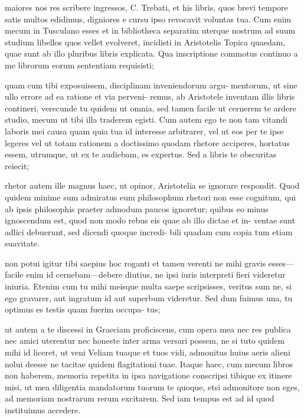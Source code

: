 
 maiores nos res scribere ingressos, C. Trebati, et his libris, quos brevi tempore satis multos edidimus, digniores e cursu ipso revocavit voluntas tua. Cum enim mecum in Tusculano esses et in bibliotheca separatim uterque nostrum ad suum studium libellos quos vellet evolveret, incidisti in Aristotelis Topica quaedam, quae sunt ab illo pluribus libris explicata. Qua inscriptione commotus continuo a me librorum eorum sententiam requisisti;

 quam cum tibi exposuissem, disciplinam inveniendorum argu- mentorum, ut sine ullo errore ad ea ratione et via perveni- remus, ab Aristotele inventam illis libris contineri, verecunde tu quidem ut omnia, sed tamen facile ut cernerem te ardere studio, mecum ut tibi illa traderem egisti. Cum autem ego te non tam vitandi laboris mei causa quam quia tua id interesse arbitrarer, vel ut eos per te ipse legeres vel ut totam rationem a doctissimo quodam rhetore acciperes, hortatus essem, utrumque, ut ex te audiebam, es expertus. Sed a libris te obscuritas reiecit;

 rhetor autem ille magnus haec, ut opinor, Aristotelia se ignorare respondit. Quod quidem minime sum admiratus eum philosophum rhetori non esse cognitum, qui ab ipsis philosophis praeter admodum paucos ignoretur; quibus eo minus ignoscendum est, quod non modo rebus eis quae ab illo dictae et in- ventae sunt adlici debuerunt, sed dicendi quoque incredi- bili quadam cum copia tum etiam suavitate.

 non potui igitur tibi saepius hoc roganti et tamen verenti ne mihi gravis esses—facile enim id cernebam—debere diutius, ne ipsi iuris interpreti fieri videretur iniuria. Etenim cum tu mihi meisque multa saepe scripsisses, veritus sum ne, si ego gravarer, aut ingratum id aut superbum videretur. Sed dum fuimus una, tu optimus es testis quam fuerim occupa- tus;

 ut autem a te discessi in Graeciam proficiscens, cum opera mea nec res publica nec amici uterentur nec honeste inter arma versari possem, ne si tuto quidem mihi id liceret, ut veni Veliam tuaque et tuos vidi, admonitus huius aeris alieni nolui deesse ne tacitae quidem flagitationi tuae. Itaque haec, cum mecum libros non haberem, memoria repetita in ipsa navigatione conscripsi tibique ex itinere misi, ut mea diligentia mandatorum tuorum te quoque, etsi admonitore non eges, ad memoriam nostrarum rerum excitarem. Sed iam tempus est ad id quod instituimus accedere.

